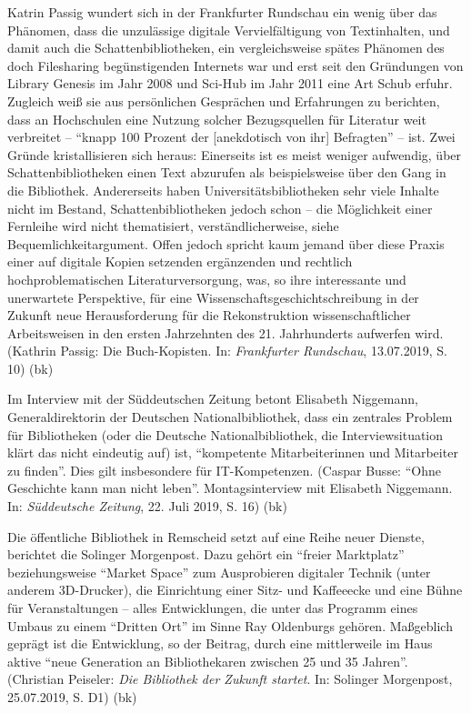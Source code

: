 \documentclass[a4paper,
fontsize=11pt,
oneside,
numbers=noperiodatend,
parskip=half-,
bibliography=totoc,
final
]{scrartcl}
\begin{document}
Katrin Passig wundert sich in der Frankfurter Rundschau ein wenig über
das Phänomen, dass die unzulässige digitale Vervielfältigung von
Textinhalten, und damit auch die Schattenbibliotheken, ein
vergleichsweise spätes Phänomen des doch Filesharing begünstigenden
Internets war und erst seit den Gründungen von Library Genesis im Jahr
2008 und Sci-Hub im Jahr 2011 eine Art Schub erfuhr. Zugleich weiß sie
aus persönlichen Gesprächen und Erfahrungen zu berichten, dass an
Hochschulen eine Nutzung solcher Bezugsquellen für Literatur weit
verbreitet -- \enquote{knapp 100 Prozent der {[}anekdotisch von ihr{]}
Befragten} -- ist. Zwei Gründe kristallisieren sich heraus: Einerseits
ist es meist weniger aufwendig, über Schattenbibliotheken einen Text
abzurufen als beispielsweise über den Gang in die Bibliothek.
Andererseits haben Universitätsbibliotheken sehr viele Inhalte nicht im
Bestand, Schattenbibliotheken jedoch schon -- die Möglichkeit einer
Fernleihe wird nicht thematisiert, verständlicherweise, siehe
Bequemlichkeitargument. Offen jedoch spricht kaum jemand über diese
Praxis einer auf digitale Kopien setzenden ergänzenden und rechtlich
hochproblematischen Literaturversorgung, was, so ihre interessante und
unerwartete Perspektive, für eine Wissenschaftsgeschichtschreibung in
der Zukunft neue Herausforderung für die Rekonstruktion
wissenschaftlicher Arbeitsweisen in den ersten Jahrzehnten des 21.
Jahrhunderts aufwerfen wird. (Kathrin Passig: Die Buch-Kopisten. In:
\emph{Frankfurter Rundschau}, 13.07.2019, S. 10) (bk)

Im Interview mit der Süddeutschen Zeitung betont Elisabeth Niggemann,
Generaldirektorin der Deutschen Nationalbibliothek, dass ein zentrales
Problem für Bibliotheken (oder die Deutsche Nationalbibliothek, die
Interviewsituation klärt das nicht eindeutig auf) ist,
\enquote{kompetente Mitarbeiterinnen und Mitarbeiter zu finden}. Dies
gilt insbesondere für IT-Kompetenzen. (Caspar Busse: \enquote{Ohne
Geschichte kann man nicht leben}. Montagsinterview mit Elisabeth
Niggemann. In: \emph{Süddeutsche Zeitung}, 22. Juli 2019, S. 16) (bk)

Die öffentliche Bibliothek in Remscheid setzt auf eine Reihe neuer
Dienste, berichtet die Solinger Morgenpost. Dazu gehört ein
\enquote{freier Marktplatz} beziehungsweise \enquote{Market Space} zum
Ausprobieren digitaler Technik (unter anderem 3D-Drucker), die
Einrichtung einer Sitz- und Kaffeeecke und eine Bühne für
Veranstaltungen -- alles Entwicklungen, die unter das Programm eines
Umbaus zu einem \enquote{Dritten Ort} im Sinne Ray Oldenburgs gehören.
Maßgeblich geprägt ist die Entwicklung, so der Beitrag, durch eine
mittlerweile im Haus aktive \enquote{neue Generation an Bibliothekaren
zwischen 25 und 35 Jahren}. (Christian Peiseler: \emph{Die Bibliothek
der Zukunft startet}. In: Solinger Morgenpost, 25.07.2019, S. D1) (bk)
\end{document}
